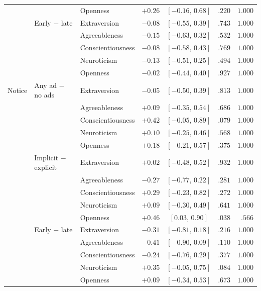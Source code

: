 \begin{table}[H]
\begin{tabular}{@{}ll l r c r r@{}}
 &  & Openness & $+0.26$ & $[-0.16,\,0.68]$ & $.220$ & $1.000$ \\
 & Early − late & Extraversion & $-0.08$ & $[-0.55,\,0.39]$ & $.743$ & $1.000$ \\
 &  & Agreeableness & $-0.15$ & $[-0.63,\,0.32]$ & $.532$ & $1.000$ \\
 &  & Conscientiousness & $-0.08$ & $[-0.58,\,0.43]$ & $.769$ & $1.000$ \\
 &  & Neuroticism & $-0.13$ & $[-0.51,\,0.25]$ & $.494$ & $1.000$ \\
 &  & Openness & $-0.02$ & $[-0.44,\,0.40]$ & $.927$ & $1.000$ \\
\midrule
Notice & Any ad − no ads & Extraversion & $-0.05$ & $[-0.50,\,0.39]$ & $.813$ & $1.000$ \\
 &  & Agreeableness & $+0.09$ & $[-0.35,\,0.54]$ & $.686$ & $1.000$ \\
 &  & Conscientiousness & $+0.42$ & $[-0.05,\,0.89]$ & $.079$ & $1.000$ \\
 &  & Neuroticism & $+0.10$ & $[-0.25,\,0.46]$ & $.568$ & $1.000$ \\
 &  & Openness & $+0.18$ & $[-0.21,\,0.57]$ & $.375$ & $1.000$ \\
 & Implicit − explicit & Extraversion & $+0.02$ & $[-0.48,\,0.52]$ & $.932$ & $1.000$ \\
 &  & Agreeableness & $-0.27$ & $[-0.77,\,0.22]$ & $.281$ & $1.000$ \\
 &  & Conscientiousness & $+0.29$ & $[-0.23,\,0.82]$ & $.272$ & $1.000$ \\
 &  & Neuroticism & $+0.09$ & $[-0.30,\,0.49]$ & $.641$ & $1.000$ \\
 &  & Openness & $+0.46$ & $[0.03,\,0.90]$ & $.038$ & $.566$ \\
 & Early − late & Extraversion & $-0.31$ & $[-0.81,\,0.18]$ & $.216$ & $1.000$ \\
 &  & Agreeableness & $-0.41$ & $[-0.90,\,0.09]$ & $.110$ & $1.000$ \\
 &  & Conscientiousness & $-0.24$ & $[-0.76,\,0.29]$ & $.377$ & $1.000$ \\
 &  & Neuroticism & $+0.35$ & $[-0.05,\,0.75]$ & $.084$ & $1.000$ \\
 &  & Openness & $+0.09$ & $[-0.34,\,0.53]$ & $.673$ & $1.000$ \\
\bottomrule
\end{tabular}
\end{table}
